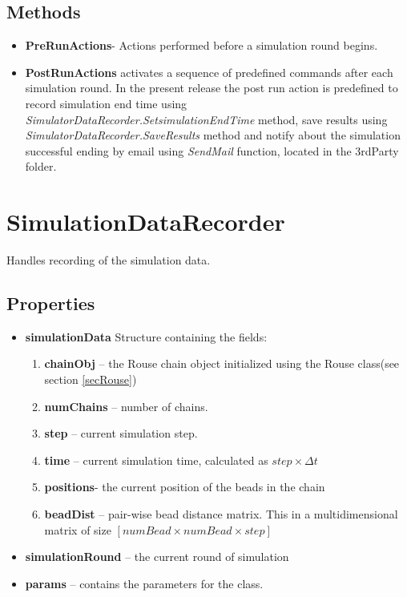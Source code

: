 \documentclass[12pt]{report}
\begin{document}
\subsection{Methods}
\begin{itemize}
\item{\textbf{PreRunActions}}- Actions performed before a simulation round begins. 

\item{\textbf{PostRunActions}} activates a sequence of predefined commands after each simulation round. In the present release the post run action is predefined to record simulation end time using \textit{SimulatorDataRecorder.SetsimulationEndTime} method, save results using \textit{SimulatorDataRecorder.SaveResults} method and notify about the simulation successful ending by email using \textit{SendMail} function, located in the 3rdParty folder.
\end{itemize}


\section{SimulationDataRecorder}\label{secSimulatorDataRecorder}
Handles recording of the simulation data.
\subsection{Properties}
\begin{itemize}
\item{\textbf{simulationData}
 Structure containing the fields:
\begin{enumerate}
\item{\textbf{chainObj}} – the Rouse chain object initialized using the Rouse class(see section \ref{secRouse})
\item{\textbf{numChains}} – number of chains.
\item{\textbf{step}} – current simulation step.
\item{\textbf{time}} – current simulation time, calculated as $step\times\Delta t$
\item{\textbf{positions}}- the current position of the beads in the chain
\item{\textbf{beadDist}} – pair-wise bead distance matrix. This in a multidimensional matrix of size $[numBead \times
numBead \times step]$
\end{enumerate}}

\item{\textbf{simulationRound}} – the current round of simulation
\item{\textbf{params}} – contains the parameters for the class.
\end{itemize}
\end{document}
